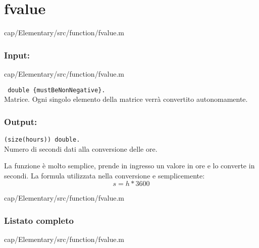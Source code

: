 \section{fvalue}\label{fnc:fvalue}


{cap/Elementary/src/function/fvalue.m}%

\subsubsection{Input:}

{cap/Elementary/src/function/fvalue.m}%

\begin{tcolorbox}
    \begin{description} 
        \setlength{\itemindent}{-.2in}%
        \item[\textit{hours:}] \verb| double {mustBeNonNegative}.|\\
        Matrice. Ogni singolo elemento della matrice verrà convertito 
        autonomamente.
    \end{description}
\end{tcolorbox}

\subsubsection{Output:}
\begin{tcolorbox}
    \begin{description}
        \setlength{\itemindent}{-.2in}
        \item[\textit{seconds:}] \verb|(size(hours)) double.|\\
        Numero di secondi dati alla conversione delle ore.
    \end{description}
\end{tcolorbox}

La funzione è molto semplice, prende in ingresso un valore in ore e lo 
converte in secondi. La formula utilizzata nella conversione e semplicemente: 
$$s=h*3600$$

{cap/Elementary/src/function/fvalue.m}%

\begin{changelog}[author=\CGC, simple, title={Modifiche alla funzione}, 
    label=chgf:hoursToSecond, sectioncmd=\subsubsection*]
    
    
    
\end{changelog}
\newpage
\subsubsection{Listato completo}

{cap/Elementary/src/function/fvalue.m}%
